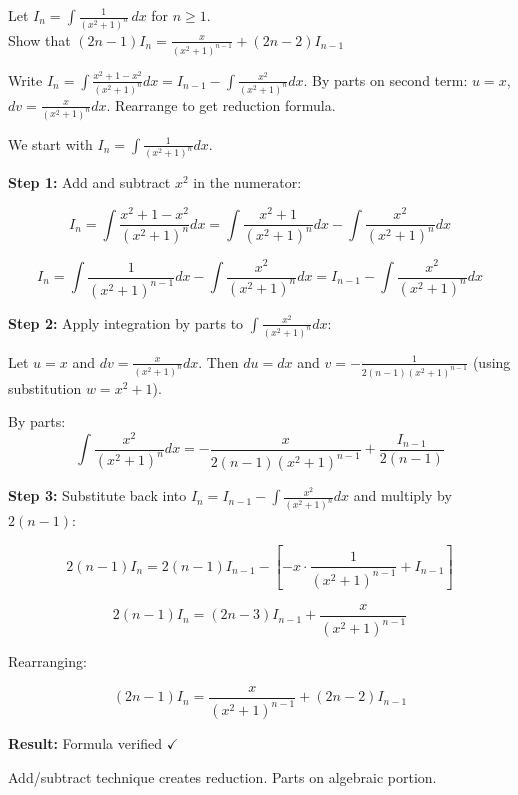 \begin{problem}
Let $I_n = \displaystyle \int \frac{1}{(x^2 + 1)^n} \, dx$ for $n \geq 1$.\\
Show that $(2n-1)I_n = \frac{x}{(x^2+1)^{n-1}} + (2n-2)I_{n-1}$
\end{problem}

\begin{hint}
Write $I_n = \int \frac{x^2 + 1 - x^2}{(x^2+1)^n}dx = I_{n-1} - \int\frac{x^2}{(x^2+1)^n}dx$. By parts on second term: $u = x$, $dv = \frac{x}{(x^2+1)^n}dx$. Rearrange to get reduction formula.
\end{hint}

\begin{solution}
We start with $I_n = \displaystyle \int \frac{1}{(x^2+1)^n}dx$.

\textbf{Step 1:} Add and subtract $x^2$ in the numerator:

\[
I_n = \int\frac{x^2 + 1 - x^2}{(x^2+1)^n}dx = \int\frac{x^2+1}{(x^2+1)^n}dx - \int\frac{x^2}{(x^2+1)^n}dx
\]

\[
I_n = \int\frac{1}{(x^2+1)^{n-1}}dx - \int\frac{x^2}{(x^2+1)^n}dx = I_{n-1} - \int\frac{x^2}{(x^2+1)^n}dx
\]

\textbf{Step 2:} Apply integration by parts to $\displaystyle \int\frac{x^2}{(x^2+1)^n}dx$:

Let $u=x$ and $dv=\frac{x}{(x^2+1)^n}dx$. Then $du=dx$ and $v=-\frac{1}{2(n-1)(x^2+1)^{n-1}}$ (using substitution $w=x^2+1$).

By parts:
\[
\int\frac{x^2}{(x^2+1)^n}dx = -\frac{x}{2(n-1)(x^2+1)^{n-1}} + \frac{I_{n-1}}{2(n-1)}
\]

\textbf{Step 3:} Substitute back into $I_n = I_{n-1} - \int\frac{x^2}{(x^2+1)^n}dx$ and multiply by $2(n-1)$:

\[
2(n-1)I_n = 2(n-1)I_{n-1} - \left[- x \cdot \frac{1}{(x^2+1)^{n-1}} + I_{n-1}\right]
\]

\[
2(n-1)I_n = (2n-3)I_{n-1} + \frac{x}{(x^2+1)^{n-1}}
\]

Rearranging:

\[
(2n-1)I_n = \frac{x}{(x^2+1)^{n-1}} + (2n-2)I_{n-1}
\]

\textbf{Result:} Formula verified $\checkmark$
\end{solution}

\begin{takeaways}
Add/subtract technique creates reduction. Parts on algebraic portion.
\end{takeaways}

